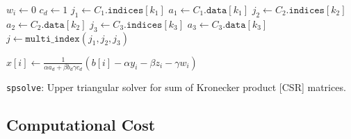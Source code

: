\begin{minipage}{\textwidth}
\begin{algorithm}[H]
{{{        $w_i \gets 0$ \; 
        $c_d \gets 1$ \; 
         {
          $j_1 \gets C_1.\texttt{indices}[k_1]$ \; 
          $a_1 \gets C_1.\texttt{data}[k_1]$ \; 
           {
            $j_2 \gets C_2.\texttt{indices}[k_2]$ \; 
            $a_2 \gets C_2.\texttt{data}[k_2]$ \; 
             {
              $j_3 \gets C_3.\texttt{indices}[k_3]$ \; 
              $a_3 \gets C_3.\texttt{data}[k_3]$ \; 
              $j \gets \texttt{multi\_index}(j_1, j_2, j_3)$ \; 
            }
          }
        }

        $x[i] \gets \frac{1}{\alpha a_d + \beta b_d \gamma c_d}(b[i] - \alpha y_i - \beta z_i - \gamma w_i)$ \; 

      }
    }
  }

  \caption{\texttt{spsolve}: Upper triangular solver for sum of Kronecker product [CSR] matrices.}
\end{algorithm} 
\end{minipage}

\clearpage
\subsection{Computational Cost}
